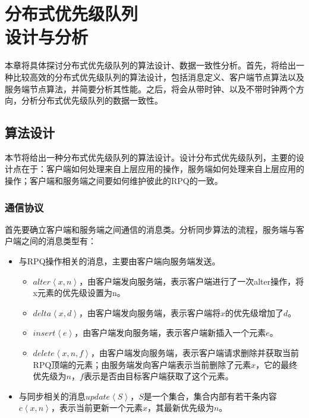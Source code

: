 \chapter{分布式优先级队列\\设计与分析}
\label{chapter:algorithm}
\par 本章将具体探讨分布式优先级队列的算法设计、数据一致性分析。首先，将给出一种比较高效的分布式优先级队列的算法设计，包括消息定义、客户端节点算法以及服务端节点算法，并简要分析其性能。之后，将会从带时钟、以及不带时钟两个方向，分析分布式优先级队列的数据一致性。
\section{算法设计}
	\label{section:algorithm}
	\par 本节将给出一种分布式优先级队列的算法设计。设计分布式优先级队列，主要的设计点在于：客户端如何处理来自上层应用的操作，服务端如何处理来自上层应用的操作；客户端和服务端之间要如何维护彼此的RPQ的一致。
	\subsection{通信协议}
		\label{section:protocol}
		\par 首先要确立客户端和服务端之间通信的消息类。分析同步算法的流程，服务端与客户端之间的消息类型有：
		\begin{itemize}
			\item 与RPQ操作相关的消息，主要由客户端向服务端发送。
			\begin{itemize}
				\item $alter\left\langle x,n\right\rangle $，由客户端发向服务端，表示客户端进行了一次alter操作，将x元素的优先级设置为n。
				\item $delta\left\langle x,d\right\rangle $，由客户端发向服务端，表示客户端将$x$的优先级增加了$d$。
				\item $insert\left\langle e\right\rangle $，由客户端发向服务端，表示客户端新插入一个元素$e$。
				\item $delete\left\langle x,n,f\right\rangle $，由客户端发向服务端，表示客户端请求删除并获取当前RPQ顶端的元素；由服务端发向客户端表示当前删除了元素$x$，它的最终优先级为$n$，$f$表示是否由目标客户端获取了这个元素。
			\end{itemize}
			\item 与同步相关的消息$update\left\langle S\right\rangle $，$S$是一个集合，集合内部有若干条内容$c\left\langle x,n\right\rangle $，表示当前更新一个元素$x$，其最新优先级为$n$。
		\end{itemize}
